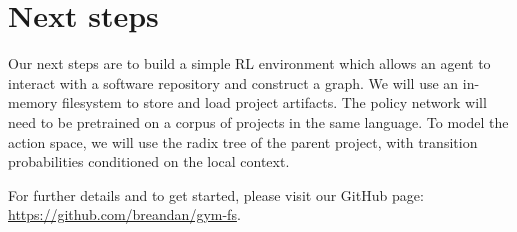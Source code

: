 \documentclass[11pt]{article}
\begin{document}
\section{Next steps}

Our next steps are to build a simple RL environment which allows an agent to interact with a software repository and construct a graph. We will use an in-memory filesystem to store and load project artifacts. The policy network will need to be pretrained on a corpus of projects in the same language. To model the action space, we will use the radix tree of the parent project, with transition probabilities conditioned on the local context.

For further details and to get started, please visit our GitHub page: \url{https://github.com/breandan/gym-fs}.

  
  
\end{document}
